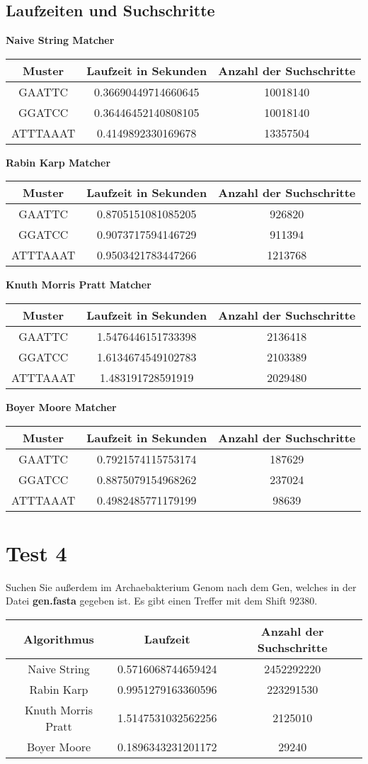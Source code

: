 \documentclass[a4paper,12pt]{article}
\begin{document}
\subsection*{Laufzeiten und Suchschritte}
\textbf{Naive String Matcher}
\newline
\begin{tabular}{c|c|c}
Muster & Laufzeit in Sekunden & Anzahl der Suchschritte  \\
\hline
GAATTC & 0.36690449714660645 & 10018140 \\
GGATCC & 0.36446452140808105 & 10018140 \\
ATTTAAAT & 0.4149892330169678 & 13357504
\end{tabular}
\newline \newline
\textbf{Rabin Karp Matcher}
\newline 
\begin{tabular}{c|c|c}
Muster & Laufzeit in Sekunden & Anzahl der Suchschritte  \\
\hline
GAATTC & 0.8705151081085205 & 926820 \\
GGATCC & 0.9073717594146729 & 911394 \\
ATTTAAAT & 0.9503421783447266 & 1213768
\end{tabular}
\newpage
\textbf{Knuth Morris Pratt Matcher}
\newline 
\begin{tabular}{c|c|c}
Muster & Laufzeit in Sekunden & Anzahl der Suchschritte  \\
\hline
GAATTC & 1.5476446151733398 & 2136418 \\
GGATCC & 1.6134674549102783 & 2103389 \\
ATTTAAAT & 1.483191728591919 & 2029480
\end{tabular}
\newline \newline
\textbf{Boyer Moore Matcher}
\newline 
\begin{tabular}{c|c|c}
Muster & Laufzeit in Sekunden & Anzahl der Suchschritte  \\
\hline
GAATTC & 0.7921574115753174 & 187629 \\
GGATCC & 0.8875079154968262 & 237024 \\
ATTTAAAT & 0.4982485771179199 & 98639
\end{tabular}

\section*{Test 4}
Suchen Sie außerdem im Archaebakterium Genom nach dem Gen, welches
in der Datei \textbf{gen.fasta} gegeben ist. \newline \newline
Es gibt einen Treffer mit dem Shift 92380. \newline

\begin{tabular}{c|c|c}
Algorithmus &  Laufzeit & Anzahl der Suchschritte  \\
\hline
Naive String & 0.5716068744659424 & 2452292220 \\
Rabin Karp & 0.9951279163360596 & 223291530 \\
Knuth Morris Pratt & 1.5147531032562256 & 2125010 \\
Boyer Moore & 0.1896343231201172 & 29240 \\
\end{tabular}
\end{document}
